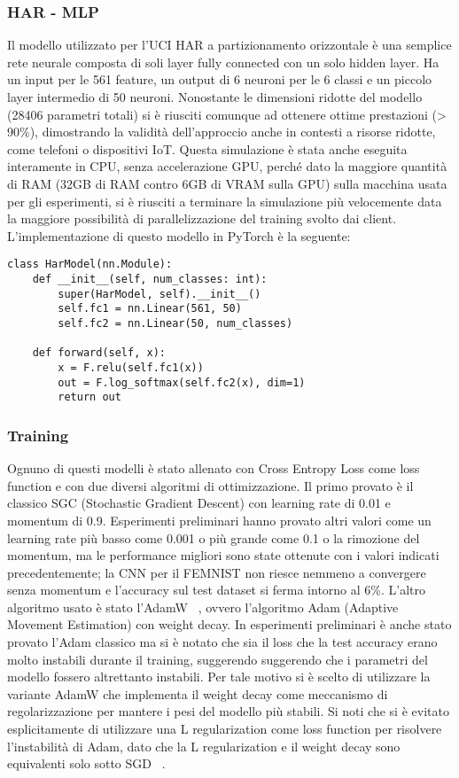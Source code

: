 \subsubsection{HAR - MLP}
Il modello utilizzato per l'UCI HAR a partizionamento orizzontale 
è una semplice rete neurale composta di soli layer fully connected 
con un solo hidden layer. Ha un input per le 561 feature, un output 
di 6 neuroni per le 6 classi e un piccolo layer intermedio di 50 neuroni.
Nonostante le dimensioni ridotte del modello (28406 parametri totali)
si è riusciti comunque ad ottenere ottime prestazioni (> 90\%),
dimostrando la validità dell'approccio anche in contesti a risorse
ridotte, come telefoni o dispositivi IoT. Questa simulazione è stata 
anche eseguita interamente in CPU, senza accelerazione GPU, perché 
dato la maggiore quantità di RAM (32GB di RAM contro 6GB di VRAM
sulla GPU) sulla macchina usata per gli esperimenti, si è riusciti a 
terminare la simulazione più velocemente data la maggiore possibilità
di parallelizzazione del training svolto dai client. L'implementazione
di questo modello in PyTorch è la seguente:

\begin{lstlisting}
class HarModel(nn.Module):
    def __init__(self, num_classes: int):
        super(HarModel, self).__init__()
        self.fc1 = nn.Linear(561, 50)
        self.fc2 = nn.Linear(50, num_classes)

    def forward(self, x):
        x = F.relu(self.fc1(x))
        out = F.log_softmax(self.fc2(x), dim=1)
        return out
\end{lstlisting}


\subsubsection{Training}
Ognuno di questi modelli è stato allenato con Cross Entropy Loss
come loss function e con due diversi algoritmi di 
ottimizzazione.
Il primo provato è il classico SGC (Stochastic Gradient
Descent) con learning rate di 0.01 e momentum di 0.9. Esperimenti
preliminari hanno provato altri valori come un learning rate più basso
come 0.001 o più grande come 0.1 o la rimozione del momentum, ma le 
performance migliori sono state ottenute con i valori indicati 
precedentemente; la CNN per il FEMNIST non riesce nemmeno a convergere 
senza momentum e l'accuracy sul test dataset si ferma intorno al 6\%.
L'altro algoritmo usato è stato l'AdamW ~\cite{Loshchilov2017AdamW}, 
ovvero l'algoritmo Adam (Adaptive Movement Estimation) con weight 
decay. In esperimenti preliminari è anche stato provato l'Adam classico 
ma si è notato che sia il loss che la test accuracy erano molto 
instabili durante il training, suggerendo suggerendo che i parametri 
del modello fossero altrettanto instabili. Per tale motivo si è 
scelto di utilizzare la variante AdamW che implementa il weight decay 
come meccanismo di regolarizzazione per mantere i pesi del modello più
stabili. Si noti che si è evitato esplicitamente di utilizzare una 
L regularization come loss function per risolvere l'instabilità 
di Adam, dato che la L regularization e il weight decay sono 
equivalenti solo sotto SGD ~\cite{Loshchilov2017AdamW}.

